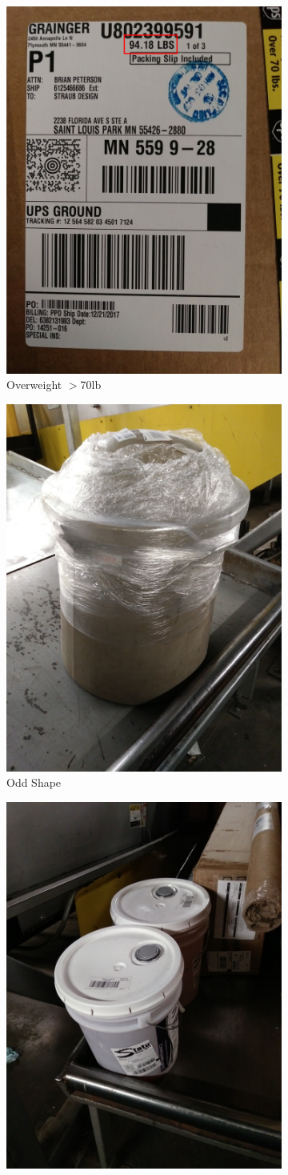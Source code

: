 \documentclass[12pt]{article}
\begin{document}
\begin{figure}[H]
\begin{subfigure}{0.5\textwidth}
\centering
\includegraphics[width=0.4\linewidth]{20171221_203710_irg.jpg} 
\caption{Overweight $>$70lb}
\end{subfigure}
\begin{subfigure}{0.5\textwidth}
\centering
\includegraphics[width=0.4\linewidth]{20171222_022314.jpg}
\caption{Odd Shape}
\end{subfigure}
\begin{subfigure}{0.5\textwidth}
\centering
\includegraphics[width=0.4\linewidth]{20171222_022238.jpg}

\end{subfigure}
\end{figure}
\end{document}
